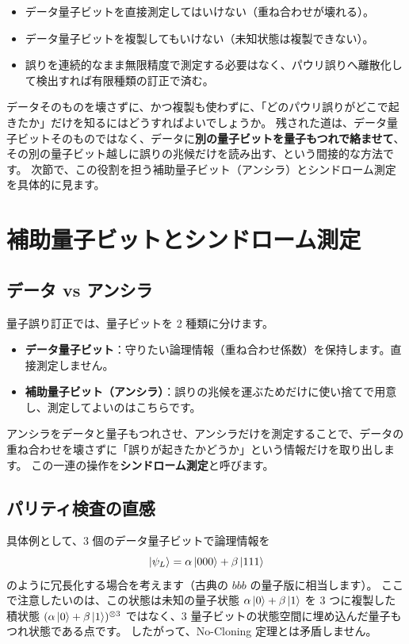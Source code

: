 \begin{itemize}
  \item データ量子ビットを直接測定してはいけない（重ね合わせが壊れる）。
  \item データ量子ビットを複製してもいけない（未知状態は複製できない）。
  \item 誤りを連続的なまま無限精度で測定する必要はなく、パウリ誤りへ離散化して検出すれば有限種類の訂正で済む。
\end{itemize}

データそのものを壊さずに、かつ複製も使わずに、「どのパウリ誤りがどこで起きたか」だけを知るにはどうすればよいでしょうか。
残された道は、データ量子ビットそのものではなく、データに\textbf{別の量子ビットを量子もつれで絡ませて}、その別の量子ビット越しに誤りの兆候だけを読み出す、という間接的な方法です。
次節で、この役割を担う補助量子ビット（アンシラ）とシンドローム測定を具体的に見ます。

\section{補助量子ビットとシンドローム測定}\label{sec:syndrome}

\subsection{データ vs アンシラ}

量子誤り訂正では、量子ビットを 2 種類に分けます。

\begin{itemize}
  \item \textbf{データ量子ビット}：守りたい論理情報（重ね合わせ係数）を保持します。直接測定しません。
  \item \textbf{補助量子ビット（アンシラ）}：誤りの兆候を運ぶためだけに使い捨てで用意し、測定してよいのはこちらです。
\end{itemize}

アンシラをデータと量子もつれさせ、アンシラだけを測定することで、データの重ね合わせを壊さずに「誤りが起きたかどうか」という情報だけを取り出します。
この一連の操作を\textbf{シンドローム測定}と呼びます。

\subsection{パリティ検査の直感}

具体例として、3 個のデータ量子ビットで論理情報を
\begin{equation}
  \ket{\psi_L} = \alpha\ket{000} + \beta\ket{111}
\end{equation}
のように冗長化する場合を考えます（古典の $bbb$ の量子版に相当します）。
ここで注意したいのは、この状態は未知の量子状態 $\alpha\ket0+\beta\ket1$ を 3 つに複製した積状態 $(\alpha\ket0+\beta\ket1)^{\otimes 3}$ ではなく、3 量子ビットの状態空間に埋め込んだ量子もつれ状態である点です。
したがって、No-Cloning 定理とは矛盾しません。

